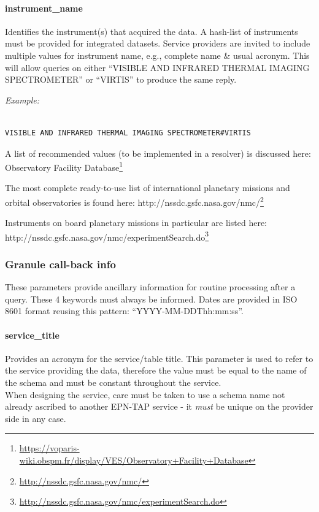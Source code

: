 \documentclass[11pt,a4paper]{ivoa}
\begin{document}
\paragraph{instrument\_name}

Identifies the instrument(s) that acquired the data. A hash-list of instruments must be provided for integrated datasets. Service providers are invited to include multiple values for instrument name, e.g., complete name \& usual acronym. This will allow queries on either ``VISIBLE AND INFRARED THERMAL IMAGING SPECTROMETER'' or ``VIRTIS'' to produce the same reply. 

\emph{\emph{Example:}}

\begin{verbatim}

VISIBLE AND INFRARED THERMAL IMAGING SPECTROMETER#VIRTIS

\end{verbatim}

A list of recommended values (to be implemented in a resolver) is discussed here: Observatory Facility Database\footnote{\url{https://voparis-wiki.obspm.fr/display/VES/Observatory+Facility+Database}}

The most complete ready-to-use list of international planetary missions and orbital observatories is found here: http://nssdc.gsfc.nasa.gov/nmc/\footnote{\url{http://nssdc.gsfc.nasa.gov/nmc/}}

Instruments on board planetary missions in particular are listed here: \\http://nssdc.gsfc.nasa.gov/nmc/experimentSearch.do\footnote{\url{http://nssdc.gsfc.nasa.gov/nmc/experimentSearch.do}}

\subsubsection{Granule call-back info}

These parameters provide ancillary information for routine processing after a query. These 4 keywords must always be informed. Dates are provided in ISO 8601 format reusing this pattern: “YYYY-MM-DDThh:mm:ss”. 

\paragraph{service\_title}

Provides an acronym for the service/table title. This parameter is used to refer to the service providing the data, therefore the value must be equal to the name of the schema and must be constant throughout the service.\\When designing the service, care must be taken to use a schema name not already ascribed to another EPN-TAP service - it \emph{must} be unique on the provider side in any case.
\end{document}
